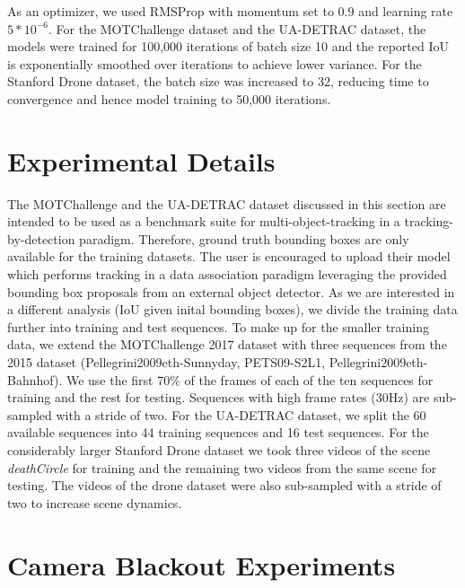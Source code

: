 As an optimizer, we used RMSProp with momentum set to $0.9$ and learning rate $5*10^{-6}$. For the MOTChallenge dataset and the UA-DETRAC dataset, the models were trained for 100,000 iterations of batch size 10 and the reported IoU is exponentially smoothed over iterations to achieve lower variance. For the Stanford Drone dataset, the batch size was increased to 32, reducing time to convergence and hence model training to 50,000 iterations.

\section{Experimental Details}
\label{sec:experimental_details}
The MOTChallenge and the UA-DETRAC dataset discussed in this section are intended to be used as a benchmark suite for multi-object-tracking in a tracking-by-detection paradigm. Therefore, ground truth bounding boxes are only available for the training datasets. The user is encouraged to upload their model which performs tracking in a data association paradigm leveraging the provided bounding box proposals from an external object detector. As we are interested in a different analysis (IoU given inital bounding boxes), we divide the training data further into training and test sequences. To make up for the smaller training data, we extend the MOTChallenge 2017 dataset with three sequences from the 2015 dataset (Pellegrini2009eth-Sunnyday, PETS09-S2L1, Pellegrini2009eth-Bahnhof). We use the first 70\% of the frames of each of the ten sequences for training and the rest for testing. Sequences with high frame rates (30Hz) are sub-sampled with a stride of two. For the UA-DETRAC dataset, we split the 60 available sequences into 44 training sequences and 16 test sequences. For the considerably larger Stanford Drone dataset we took three videos of the scene \textit{deathCircle} for training and the remaining two videos from the same scene for testing. The videos of the drone dataset were also sub-sampled with a stride of two to increase scene dynamics.


\section{Camera Blackout Experiments}
\label{sec:blackout}

